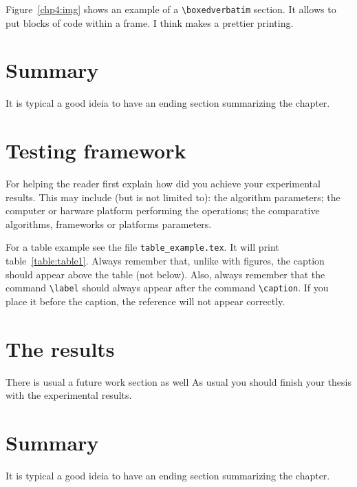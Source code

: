 \documentclass[defaultstyle,10pt,master,Helvetica]{thesis}
\begin{document}
Figure~\ref{chp4:img} shows an example of a \verb"\boxedverbatim" section. It allows to put blocks of code within a frame. I think makes a prettier printing.

\section{Summary}

It is typical a good ideia to have an ending section summarizing the chapter.

\cleardoublepage

\section{Testing framework}
For helping the reader first explain how did you achieve your experimental results. This may include (but is not limited to): the algorithm parameters; the computer or harware platform performing the operations; the comparative algorithms, frameworks or platforms parameters.



For a table example see the file \verb"table_example.tex". It will print table~\ref{table:table1}. Always remember that, unlike with figures, the caption should appear above the table (not below). Also, always remember that the command \verb"\label" should always appear after the command \verb"\caption". If you place it before the caption, the reference will not appear correctly.

\section{The results}
There is usual a future work section as well
As usual you should finish your thesis with the experimental results.

\section{Summary}

It is typical a good ideia to have an ending section summarizing the chapter.

\cleardoublepage
\end{document}

